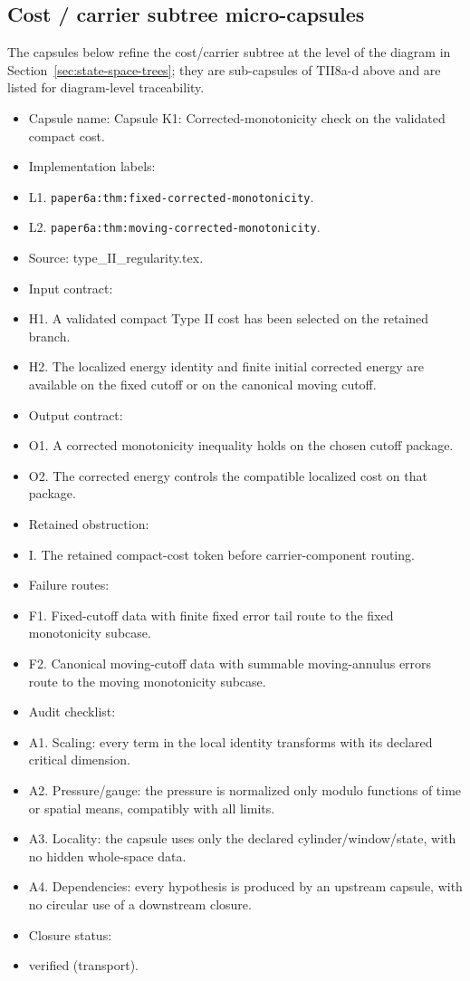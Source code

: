 \documentclass[11pt]{amsart}
\begin{document}
\subsection{Cost / carrier subtree micro-capsules}

The capsules below refine the cost/carrier subtree at the level of the
diagram in Section~\ref{sec:state-space-trees}; they are sub-capsules of TII8a-d
above and are listed for diagram-level traceability.

\begin{itemize}
  \item Capsule name: Capsule K1: Corrected-monotonicity check on the validated compact cost.
  \item Implementation labels:
  \item L1. \texttt{paper6a:thm:fixed-corrected-monotonicity}.
  \item L2. \texttt{paper6a:thm:moving-corrected-monotonicity}.
  \item Source: type\_II\_regularity.tex.
  \item Input contract:
  \item H1. A validated compact Type II cost has been selected on the retained branch.
  \item H2. The localized energy identity and finite initial corrected energy are available on the fixed cutoff or on the canonical moving cutoff.
  \item Output contract:
  \item O1. A corrected monotonicity inequality holds on the chosen cutoff package.
  \item O2. The corrected energy controls the compatible localized cost on that package.
  \item Retained obstruction:
  \item I. The retained compact-cost token before carrier-component routing.
  \item Failure routes:
  \item F1. Fixed-cutoff data with finite fixed error tail route to the fixed monotonicity subcase.
  \item F2. Canonical moving-cutoff data with summable moving-annulus errors route to the moving monotonicity subcase.
  \item Audit checklist:
  \item A1. Scaling: every term in the local identity transforms with its declared critical dimension.
  \item A2. Pressure/gauge: the pressure is normalized only modulo functions of time or spatial means, compatibly with all limits.
  \item A3. Locality: the capsule uses only the declared cylinder/window/state, with no hidden whole-space data.
  \item A4. Dependencies: every hypothesis is produced by an upstream capsule, with no circular use of a downstream closure.
  \item Closure status:
  \item verified (transport).
\end{itemize}
\end{document}
